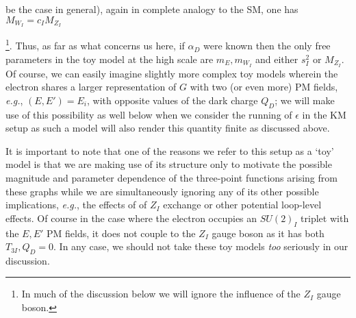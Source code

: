 \documentclass[14pt]{article}
\def\eg{{\it e.g.}}
\begin{document}
be the case in general), again in complete analogy to the SM, one has $M_{W_I}=c_IM_{Z_I}${\footnote {In much of the discussion below we will ignore the influence of the $Z_I$ gauge boson.}. 
Thus, as far as what concerns 
us here, if $\alpha_D$ were known then the only free parameters in the toy model at the high scale are $m_E, m_{W_I}$ and either $s_I^2$ or $M_{Z_I}$. Of course, we can easily imagine 
slightly more complex toy models wherein the electron shares a larger representation of $G$ with two (or even more) PM fields, \eg, $(E,E')=E_i$, with opposite values of the dark charge 
$Q_D$; we will make use of this possibility as well below when we consider the running of $\epsilon$ in the KM setup as such a model will also render this quantity finite as discussed above.  

It is important to note that one of the reasons we refer to this setup as a `toy' model is that we are making use of its structure only to motivate the possible magnitude and parameter dependence of the 
three-point functions arising from these graphs while we are simultaneously ignoring any of its other possible implications, \eg, the effects of of $Z_I$ exchange or other potential loop-level effects. 
Of course in the case where the 
electron occupies an $SU(2)_I$ triplet with the $E,E'$ PM fields, it does not couple to the $Z_I$ gauge boson as it has both $T_{3I},Q_D=0$. In any case, we should not take these toy 
models {\it too} seriously in our discussion. 

}
\end{document}
